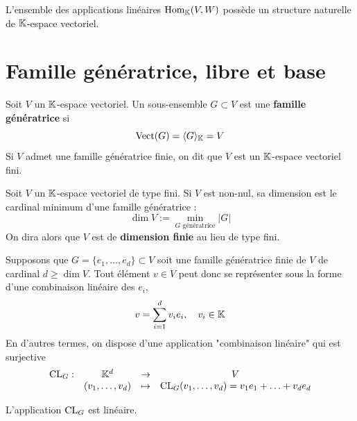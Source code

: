
\begin{thm} \label{thm: Espace des applications linéaires}
L'ensemble des applications linéaires $\operatorname{Hom}_{\mathbb{K}}(V,W)$ possède un structure naturelle de $\mathbb{K}$-espace vectoriel.
\end{thm}




\section{Famille génératrice, libre et base}
\begin{definition} \label{def: famille génératrice espace vectoriel}
	Soit $V$ un $\mathbb{K}$-espace vectoriel. Un sous-ensemble $G \subset V$ est une \textbf{famille génératrice} si
	\[
	\operatorname{Vect} (G) = \langle G \rangle_{\mathbb{K}} = V
	\]
	Si $V$ admet une famille génératrice finie, on dit que $V$ est un $\mathbb{K}$-espace vectoriel fini.
\end{definition}

\begin{definition}[Dimension] \label{def: dimension d'un espace vectoriel}
	Soit $V$ un $\mathbb{K}$-espace vectoriel de type fini. Si $V$ est non-nul, sa dimension est le cardinal minimum d'une famille génératrice :
	\[
	\dim V := \min_{G \text{ génératrice}} |G|
	\]
	On dira alors que $V$ est de \textbf{dimension finie} au lieu de type fini.
\end{definition}
Supposons que $G = \{ e_1, \ldots, e_d\} \subset V$ soit une famille génératrice finie de $V$ de cardinal $d \geqslant \dim V$. Tout élément $v \in V$ peut donc se représenter sous la forme d'une combinaison linéaire des $e_i$,
\[
v = \sum_{i=1}^d v_i e_i, \quad v_i \in \mathbb{K}
\]
En d'autres termes, on dispose d'une application "combinaison linéaire" qui est surjective
\[
\begin{array}{cccc}
	\operatorname{CL}_G : & \mathbb{K}^d & \to & V \\
			& (v_1, \ldots, v_d) & \mapsto & \operatorname{CL}_G(v_1, \ldots, v_d) = v_1 e_1 + \ldots + v_d e_d
\end{array}
\]
\begin{lem}
	L'application $\operatorname{CL}_G$ est linéaire.
\end{lem}
\prf

